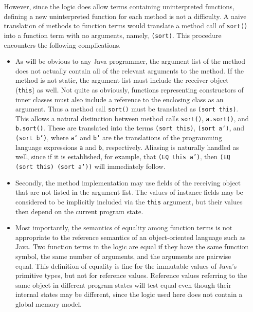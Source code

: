 \documentclass{sig-alternate}
\begin{document}
However, since the logic does allow terms containing uninterpreted functions, defining a new
uninterpreted function for each method is not a difficulty.  A naive translation of methods to
function terms would translate a method call of \texttt{sort()} into a function term with no
arguments, namely, \texttt{(sort)}.  This procedure encounters the following complications.
\setlength{\partopsep}{0in}\setlength{\parskip}{0in}\setlength{\itemsep}{0in}\setlength{\topsep}{0in}
\begin{itemize}
\setlength{\partopsep}{0in}\setlength{\parskip}{0in}\setlength{\itemsep}{0in}\setlength{\topsep}{0in}
\item
As will be obvious to any Java programmer, the argument list of the method does not 
actually contain all of the relevant arguments to the method.  If the method is not static, the
argument list must include the receiver object (\texttt{this}) as well.  Not quite as obviously,
functions representing constructors of inner classes must also include a reference to the
enclosing class as an argument.  Thus a method call 
\texttt{sort()} must be translated as \texttt{(sort this)}.
This allows a natural distinction between method calls \texttt{sort()}, \texttt{a.sort()}, and
\texttt{b.sort()}.  These are translated into the terms \texttt{(sort this)}, \texttt{(sort a')}, and
\texttt{(sort b')}, where \texttt{a'} and \texttt{b'} are the translations of
the programming language expressions \texttt{a} and \texttt{b}, respectively.  
Aliasing is naturally handled as well, since if it is established, for example, that
\texttt{(EQ this a')}, then \texttt{(EQ (sort this) (sort a'))} will immediately follow.

\item
Secondly, the method implementation may use fields
of the receiving object that are not listed in the argument list.  The values of instance fields
may be considered to be implicitly included via the \texttt{this} argument, but their values then
depend on the current program state.  

\item
Most importantly, the semantics of equality among function terms is not appropriate to the
reference semantics of an object-oriented language such as Java.  Two function terms in the
logic are equal if they have the same function symbol, the same number of arguments, and the
arguments are pairwise equal.  This definition of equality is fine for the immutable
values of Java's primitive types, but not for reference values.  Reference values 
referring to the
same object in different program
states will test equal even though their internal states may be different, since
the logic used here does not contain a global memory model.

\end{itemize}
\end{document}
